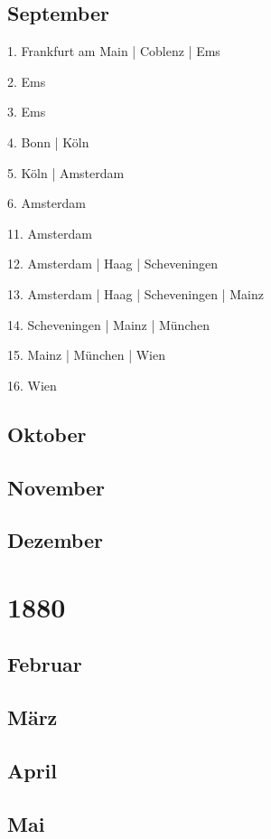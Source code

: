 \documentclass[twoside=false,titlepage=false,open=any, parskip=never, fontsize=10pt, headings=small, chapterprefix=false, appendixprefix=false, DIV=15]{scrbook}
\begin{document}
\begin{multicols}{3}
            \section*{September}
            1. Frankfurt am Main | Coblenz | Ems\par
            2. Ems\par
            3. Ems\par
            4. Bonn | Köln\par
            5. Köln | Amsterdam\par
            6. Amsterdam\par
            11. Amsterdam\par
            12. Amsterdam | Haag | Scheveningen\par
            13. Amsterdam | Haag | Scheveningen | Mainz\par
            14. Scheveningen | Mainz | München\par
            15. Mainz | München | Wien\par
            16. Wien\par
            \section*{Oktober}
            \section*{November}
            \section*{Dezember}
            \chapter*{1880}
            \section*{Februar}
            \section*{März}
            \section*{April}
            \section*{Mai}

\end{multicols}
\end{document}
